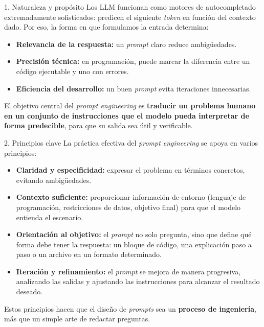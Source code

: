 \documentclass[xcolor=svgnames,t]{beamer}
\newcommand{\tightitem}{\itemsep4pt\parskip0pt\parsep0pt}
\begin{document}
\begin{frame}{1. Naturaleza y propósito}
\justifying
Los LLM funcionan como motores de autocompletado extremadamente sofisticados: predicen el siguiente \textit{token} en función del contexto dado. Por eso, la forma en que formulamos la entrada determina:

\begin{itemize}\tightitem
  \item \textbf{Relevancia de la respuesta:} un \textit{prompt} claro reduce ambigüedades.
  \item \textbf{Precisión técnica:} en programación, puede marcar la diferencia entre un código ejecutable y uno con errores.
  \item \textbf{Eficiencia del desarrollo:} un buen \textit{prompt} evita iteraciones innecesarias.
\end{itemize}

\justifying
El objetivo central del \textit{prompt engineering} es \textbf{traducir un problema humano en un conjunto de instrucciones que el modelo pueda interpretar de forma predecible}, para que su salida sea útil y verificable.
\end{frame}


\begin{frame}{2. Principios clave}
\justifying
La práctica efectiva del \textit{prompt engineering} se apoya en varios principios:

\begin{itemize}\tightitem
  \item \textbf{Claridad y especificidad:} expresar el problema en términos concretos, evitando ambigüedades.
  \item \textbf{Contexto suficiente:} proporcionar información de entorno (lenguaje de programación, restricciones de datos, objetivo final) para que el modelo entienda el escenario.
  \item \textbf{Orientación al objetivo:} el \textit{prompt} no solo pregunta, sino que define qué forma debe tener la respuesta: un bloque de código, una explicación paso a paso o un archivo en un formato determinado.
  \item \textbf{Iteración y refinamiento:} el \textit{prompt} se mejora de manera progresiva, analizando las salidas y ajustando las instrucciones para alcanzar el resultado deseado.
\end{itemize}

\justifying
Estos principios hacen que el diseño de \textit{prompts} sea un \textbf{proceso de ingeniería}, más que un simple arte de redactar preguntas.
\end{frame}
\end{document}

